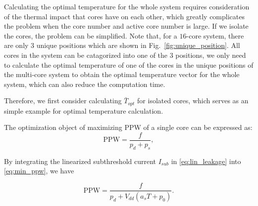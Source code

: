 Calculating the optimal temperature for the whole system requires consideration of the thermal impact that cores have on each other, which greatly complicates the problem when the core number and active core number is large. 
If we isolate the cores, the problem can be simplified. Note that, for a $16$-core system, there are only $3$ unique positions which are shown in Fig.~\ref{fig:unique_position}. All cores in the system can be catagorized into one of the $3$ positions, we only need to calculate the optimal temperature of one of the cores in the unique positions of the multi-core system to obtain the optimal temperature vector for the whole system, which can also reduce the computation time.

Therefore, we first consider calculating $\bar{T}_{opt}$ for isolated cores, which serves as an simple example for optimal temperature calculation.




The optimization object of maximizing PPW of a single core can be expressed as:
\begin{equation}\label{eq:min_ppw}
\text{PPW}=\frac{f}{p_{d}+p_{s}},
\end{equation}


By integrating the linearized subthreshold current $I_{sub}$ in \eqref{eq:lin_leakage} into \eqref{eq:min_ppw}, we have

\begin{equation}\label{eq:1_ppw}
\text{PPW} = \frac{f}{p_{d}+V_{dd}(a_{s}T+p_{0})}.
\end{equation}



